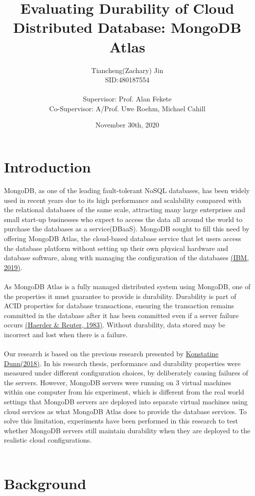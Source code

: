 \documentclass[12pt]{article}
\title{Evaluating Durability of Cloud Distributed Database: MongoDB Atlas}
\date{November 30th, 2020}
\author{Tiancheng(Zachary) Jin\\
SID:480187554\\
\\
Supervisor: Prof. Alan Fekete\\
Co-Supervisor: A/Prof. Uwe Roehm, Michael Cahill
}
\begin{document}
\newcommand{\algorithmautorefname}{Algorithm}
\maketitle
\newpage
\section{Introduction}
MongoDB, as one of the leading fault-tolerant NoSQL databases, has been widely used in recent years due to its high performance and scalability compared with the relational databases of the same scale, attracting many large enterprises and small start-up businesses who expect to access the data all around the world to purchase the databases as a service(DBaaS). MongoDB sought to fill this need by offering MongoDB Atlas, the cloud-based database service that let users access the database platform without setting up their own physical hardware and database software, along with managing the configuration of the databases \hyperref[sec:reference]{(IBM, 2019)}.\\
\\
As MongoDB Atlas is a fully managed distributed system using MongoDB, one of the properties it must guarantee to provide is durability. Durability is part of ACID properties for database transactions, ensuring the transaction remains committed in the database after it has been committed even if a server failure occurs \hyperref[sec:reference]{(Haerder \& Reuter, 1983)}. Without durability, data stored may be incorrect and lost when there is a failure.\\
\\
Our research is based on the previous research presented by \hyperref[sec:reference]{Konstatine Dunn(2018)}. In his research thesis, performance and durability properties were measured under different configuration choices, by deliberately causing failures of the servers. However, MongoDB servers were running on 3 virtual machines within one computer from his experiment, which is different from the real world settings that MongoDB servers are deployed into separate virtual machines using cloud services as what MongoDB Atlas does to provide the database services. To solve this limitation, experiments have been performed in this research to test whether MongoDB servers still maintain durability when they are deployed to the realistic cloud configurations.\\
\\
\section{Background}
\end{document}

